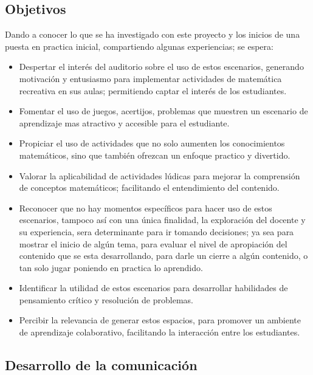 \subsection{Objetivos}

Dando a conocer lo que se ha investigado con este proyecto y los inicios de una puesta en practica inicial, compartiendo algunas experiencias; se espera:
\begin{itemize}
	\item Despertar el interés del auditorio sobre el uso de estos escenarios, generando motivación y entusiasmo para implementar actividades de matemática recreativa en sus aulas; permitiendo captar el interés de los estudiantes.
	\item Fomentar el uso de juegos, acertijos, problemas que muestren un escenario de aprendizaje mas atractivo y accesible para el estudiante.
	\item Propiciar el uso de actividades que no solo aumenten los conocimientos matemáticos, sino que también ofrezcan un enfoque practico y divertido.
	\item Valorar la aplicabilidad de actividades lúdicas para mejorar la comprensión de conceptos matemáticos; facilitando el entendimiento del contenido.
	\item Reconocer que no hay momentos específicos para hacer uso de estos escenarios, tampoco así con una única finalidad, la exploración del docente y su experiencia, sera determinante para ir tomando decisiones; ya sea para mostrar el inicio de algún tema, para evaluar el nivel de apropiación del contenido que se esta desarrollando, para darle un cierre a algún contenido, o tan solo jugar poniendo en practica lo aprendido.
	\item Identificar la utilidad de estos escenarios para desarrollar habilidades de pensamiento crítico y resolución de problemas.
	\item Percibir la relevancia de generar estos espacios, para promover un ambiente de aprendizaje colaborativo, facilitando la interacción entre los estudiantes.
\end{itemize}

\subsection{Desarrollo de la comunicación}

